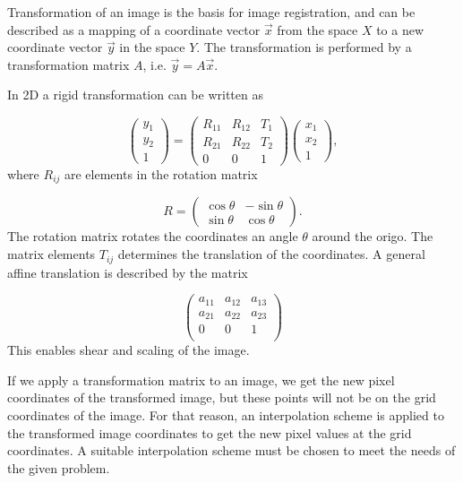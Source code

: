 Transformation of an image is the basis for image registration, and can be described as a mapping of a coordinate vector $\vec{x}$ from the space $X$ to a new coordinate vector $\vec{y}$ in the space $Y$. The transformation is performed by a transformation matrix $A$, i.e. $\vec{y} = A\vec{x}$.

In 2D a rigid transformation can be written as 

\begin{equation}
	\label{rigid}
	\begin{pmatrix}
		y_1 \\
		y_2 \\
		1 
	\end{pmatrix}
	=
	\begin{pmatrix}
		R_{11} & R_{12} & T_1\\
		R_{21} & R_{22} & T_2\\		
		0 & 0 & 1
	\end{pmatrix}
	\begin{pmatrix}
		x_1\\
		x_2\\
		1
	\end{pmatrix},
\end{equation}
where $R_{ij}$ are elements in the rotation matrix 

\begin{equation}
	R = 
	\begin{pmatrix}
	\cos \theta & -\sin \theta\\
	\sin \theta & \cos \theta
	\end{pmatrix}.
\end{equation}
The rotation matrix rotates the coordinates an angle $\theta$ around the origo. The matrix elements $T_{ij}$ determines the translation of the coordinates. A general affine translation is described by the matrix

\begin{equation}
\begin{pmatrix}
 a_{11}&a_{12}&a_{13}\\
 a_{21}&a_{22}&a_{23}\\
 0&0&1\\
 
\end{pmatrix}
\end{equation} 
This enables shear and scaling of the image.

If we apply a transformation matrix to an image, we get the new pixel coordinates of the transformed image, but these points will not be on the grid coordinates of the image. For that reason, an interpolation scheme is applied to the transformed image coordinates to get the new pixel values at the grid coordinates. A suitable interpolation scheme must be chosen to meet the needs of the given problem.

